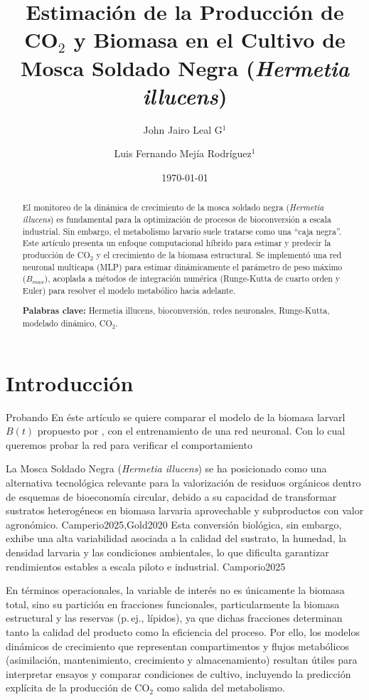 \documentclass[11pt,a4paper]{article}
\title{\textbf{Estimación de la Producción de CO$_2$ y Biomasa en el Cultivo de Mosca Soldado Negra (\textit{Hermetia illucens})}}
\author{John Jairo Leal G$^{1}$ \and Luis Fernando Mejía Rodríguez$^{1}$}
\date{\today}
\begin{document}
\maketitle

\begin{abstract}
El monitoreo de la dinámica de crecimiento de la mosca soldado negra (\textit{Hermetia illucens}) es fundamental para la optimización de procesos de bioconversión a escala industrial. Sin embargo, el metabolismo larvario suele tratarse como una ``caja negra''. Este artículo presenta un enfoque computacional híbrido para estimar y predecir la producción de CO$_2$ y el crecimiento de la biomasa estructural. Se implementó una red neuronal multicapa (MLP) para estimar dinámicamente el parámetro de peso máximo ($B_{max}$), acoplada a métodos de integración numérica (Runge-Kutta de cuarto orden y Euler) para resolver el modelo metabólico hacia adelante.

\textbf{Palabras clave:} Hermetia illucens, bioconversión, redes neuronales, Runge-Kutta, modelado dinámico, CO$_2$.
\end{abstract}

\section{Introducción}

Probando 
En éste artículo se quiere comparar el modelo de la biomasa larvarl $B(t)$ 
propuesto por \parencite{eriksenDynamicModellingFeed2022}, con el entrenamiento de una red neuronal. Con lo cual queremos probar la red para verificar el comportamiento

La Mosca Soldado Negra (\textit{Hermetia illucens}) se ha posicionado como una alternativa tecnológica relevante para la valorización de residuos orgánicos dentro de esquemas de bioeconomía circular, debido a su capacidad de transformar sustratos heterogéneos en biomasa larvaria aprovechable y subproductos con valor agronómico. Camperio2025,Gold2020 \cite{goldEffectsRearingSystem2022} Esta conversión biológica, sin embargo, exhibe una alta variabilidad asociada a la calidad del sustrato, la humedad, la densidad larvaria y las condiciones ambientales, lo que dificulta garantizar rendimientos estables a escala piloto e industrial. \cite{eriksenDynamicModellingFeed2022} Camporio2025

En términos operacionales, la variable de interés no es únicamente la biomasa total, sino su partición en fracciones funcionales, particularmente la biomasa estructural y las reservas (p.\,ej., lípidos), ya que dichas fracciones determinan tanto la calidad del producto como la eficiencia del proceso. \cite{eriksenDynamicModellingFeed2022} Por ello, los modelos dinámicos de crecimiento que representan compartimentos y flujos metabólicos (asimilación, mantenimiento, crecimiento y almacenamiento) resultan útiles para interpretar ensayos y comparar condiciones de cultivo, incluyendo la predicción explícita de la producción de CO$_2$ como salida del metabolismo. \cite{eriksenDynamicModellingFeed2022}
\end{document}
